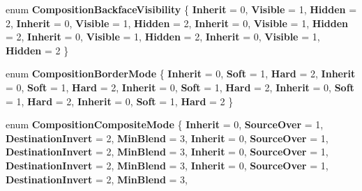 \begin{DoxyCompactItemize}
\mbox{\label{namespace_windows_1_1_u_i_1_1_composition_a2208fe30c093609e4c2f6f06851913d2}} 
enum {\bfseries Composition\+Backface\+Visibility} \{ \newline
{\bfseries Inherit} = 0, 
{\bfseries Visible} = 1, 
{\bfseries Hidden} = 2, 
{\bfseries Inherit} = 0, 
\newline
{\bfseries Visible} = 1, 
{\bfseries Hidden} = 2, 
{\bfseries Inherit} = 0, 
{\bfseries Visible} = 1, 
\newline
{\bfseries Hidden} = 2, 
{\bfseries Inherit} = 0, 
{\bfseries Visible} = 1, 
{\bfseries Hidden} = 2, 
\newline
{\bfseries Inherit} = 0, 
{\bfseries Visible} = 1, 
{\bfseries Hidden} = 2
 \}
\item 
\mbox{\label{namespace_windows_1_1_u_i_1_1_composition_ad094aac2d72715708083e1a34f7835f0}} 
enum {\bfseries Composition\+Border\+Mode} \{ \newline
{\bfseries Inherit} = 0, 
{\bfseries Soft} = 1, 
{\bfseries Hard} = 2, 
{\bfseries Inherit} = 0, 
\newline
{\bfseries Soft} = 1, 
{\bfseries Hard} = 2, 
{\bfseries Inherit} = 0, 
{\bfseries Soft} = 1, 
\newline
{\bfseries Hard} = 2, 
{\bfseries Inherit} = 0, 
{\bfseries Soft} = 1, 
{\bfseries Hard} = 2, 
\newline
{\bfseries Inherit} = 0, 
{\bfseries Soft} = 1, 
{\bfseries Hard} = 2
 \}
\item 
\mbox{\label{namespace_windows_1_1_u_i_1_1_composition_a70df9b7791d5834e00518dd51febcf2e}} 
enum {\bfseries Composition\+Composite\+Mode} \{ \newline
{\bfseries Inherit} = 0, 
{\bfseries Source\+Over} = 1, 
{\bfseries Destination\+Invert} = 2, 
{\bfseries Min\+Blend} = 3, 
\newline
{\bfseries Inherit} = 0, 
{\bfseries Source\+Over} = 1, 
{\bfseries Destination\+Invert} = 2, 
{\bfseries Min\+Blend} = 3, 
\newline
{\bfseries Inherit} = 0, 
{\bfseries Source\+Over} = 1, 
{\bfseries Destination\+Invert} = 2, 
{\bfseries Min\+Blend} = 3, 
\newline
{\bfseries Inherit} = 0, 
{\bfseries Source\+Over} = 1, 
{\bfseries Destination\+Invert} = 2, 
{\bfseries Min\+Blend} = 3, 

\end{DoxyCompactItemize}
